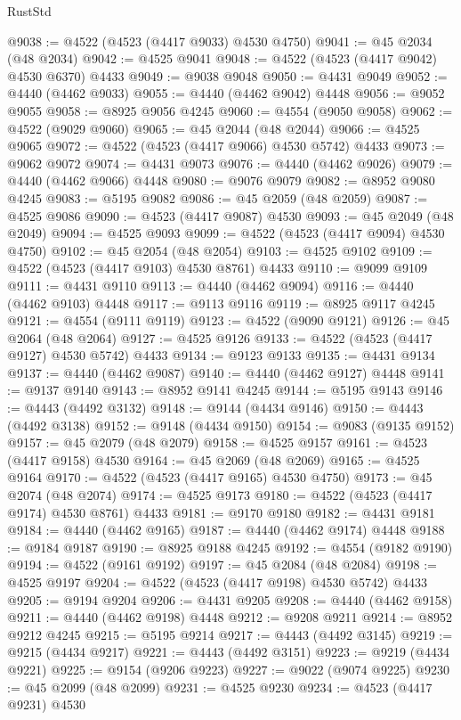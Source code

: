 \begin{lexlean}{RustStd}
\begin{coremodule}
{\begin{coremodule}
{{{{{{{{{{{{{{{{{{{{{{{{{{{{{{{{{{{{{{{{{{{{{{{{{{{{{{{{{{{{@9038 := @4522 (@4523 (@4417 @9033) @4530 @4750)
@9041 := @45 @2034 (@48 @2034)
@9042 := @4525 @9041
@9048 := @4522 (@4523 (@4417 @9042) @4530 @6370) @4433
@9049 := @9038 @9048
@9050 := @4431 @9049
@9052 := @4440 (@4462 @9033)
@9055 := @4440 (@4462 @9042) @4448
@9056 := @9052 @9055
@9058 := @8925 @9056 @4245
@9060 := @4554 (@9050 @9058)
@9062 := @4522 (@9029 @9060)
@9065 := @45 @2044 (@48 @2044)
@9066 := @4525 @9065
@9072 := @4522 (@4523 (@4417 @9066) @4530 @5742) @4433
@9073 := @9062 @9072
@9074 := @4431 @9073
@9076 := @4440 (@4462 @9026)
@9079 := @4440 (@4462 @9066) @4448
@9080 := @9076 @9079
@9082 := @8952 @9080 @4245
@9083 := @5195 @9082
@9086 := @45 @2059 (@48 @2059)
@9087 := @4525 @9086
@9090 := @4523 (@4417 @9087) @4530
@9093 := @45 @2049 (@48 @2049)
@9094 := @4525 @9093
@9099 := @4522 (@4523 (@4417 @9094) @4530 @4750)
@9102 := @45 @2054 (@48 @2054)
@9103 := @4525 @9102
@9109 := @4522 (@4523 (@4417 @9103) @4530 @8761) @4433
@9110 := @9099 @9109
@9111 := @4431 @9110
@9113 := @4440 (@4462 @9094)
@9116 := @4440 (@4462 @9103) @4448
@9117 := @9113 @9116
@9119 := @8925 @9117 @4245
@9121 := @4554 (@9111 @9119)
@9123 := @4522 (@9090 @9121)
@9126 := @45 @2064 (@48 @2064)
@9127 := @4525 @9126
@9133 := @4522 (@4523 (@4417 @9127) @4530 @5742) @4433
@9134 := @9123 @9133
@9135 := @4431 @9134
@9137 := @4440 (@4462 @9087)
@9140 := @4440 (@4462 @9127) @4448
@9141 := @9137 @9140
@9143 := @8952 @9141 @4245
@9144 := @5195 @9143
@9146 := @4443 (@4492 @3132)
@9148 := @9144 (@4434 @9146)
@9150 := @4443 (@4492 @3138)
@9152 := @9148 (@4434 @9150)
@9154 := @9083 (@9135 @9152)
@9157 := @45 @2079 (@48 @2079)
@9158 := @4525 @9157
@9161 := @4523 (@4417 @9158) @4530
@9164 := @45 @2069 (@48 @2069)
@9165 := @4525 @9164
@9170 := @4522 (@4523 (@4417 @9165) @4530 @4750)
@9173 := @45 @2074 (@48 @2074)
@9174 := @4525 @9173
@9180 := @4522 (@4523 (@4417 @9174) @4530 @8761) @4433
@9181 := @9170 @9180
@9182 := @4431 @9181
@9184 := @4440 (@4462 @9165)
@9187 := @4440 (@4462 @9174) @4448
@9188 := @9184 @9187
@9190 := @8925 @9188 @4245
@9192 := @4554 (@9182 @9190)
@9194 := @4522 (@9161 @9192)
@9197 := @45 @2084 (@48 @2084)
@9198 := @4525 @9197
@9204 := @4522 (@4523 (@4417 @9198) @4530 @5742) @4433
@9205 := @9194 @9204
@9206 := @4431 @9205
@9208 := @4440 (@4462 @9158)
@9211 := @4440 (@4462 @9198) @4448
@9212 := @9208 @9211
@9214 := @8952 @9212 @4245
@9215 := @5195 @9214
@9217 := @4443 (@4492 @3145)
@9219 := @9215 (@4434 @9217)
@9221 := @4443 (@4492 @3151)
@9223 := @9219 (@4434 @9221)
@9225 := @9154 (@9206 @9223)
@9227 := @9022 (@9074 @9225)
@9230 := @45 @2099 (@48 @2099)
@9231 := @4525 @9230
@9234 := @4523 (@4417 @9231) @4530
}}}}}}}}}}}}}}}}}}}}}}}}}}}}}}}}}}}}}}}}}}}}}}}}}}}}}}}}}}}}
\end{coremodule}}
\end{coremodule}
\end{lexlean}
